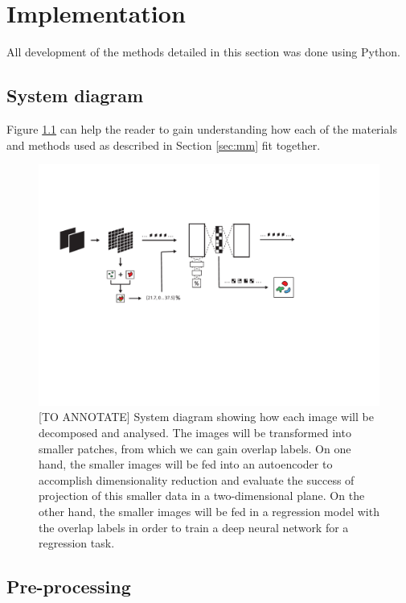 \chapter{Implementation} \label{sec:implementation}

All development of the methods detailed in this section was done using Python.

\section{System diagram}

Figure \ref{fig:system} can help the reader to gain understanding how each of the materials and methods used as described in Section \ref{sec:mm} fit together.

\begin{figure}[h!]
    \centering
    \includegraphics[width=\textwidth]{dissertation/figures/system_diagram.pdf}
    \caption{[TO ANNOTATE] System diagram showing how each image will be decomposed and analysed. The images will be transformed into smaller patches, from which we can gain overlap labels. On one hand, the smaller images will be fed into an autoencoder to accomplish dimensionality reduction and evaluate the success of projection of this smaller data in a two-dimensional plane. On the other hand, the smaller images will be fed in a regression model with the overlap labels in order to train a deep neural network for a regression task.}
    \label{fig:system}
\end{figure}

\section{Pre-processing}

